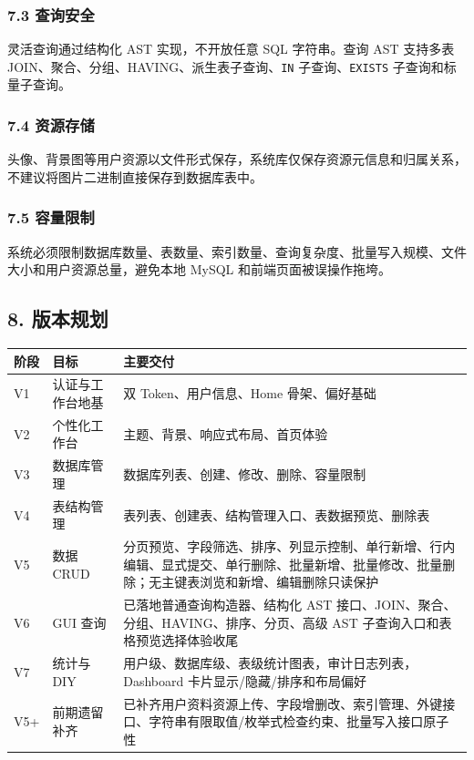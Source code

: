 \documentclass[
  a4paper,
  UTF8]{ctexart}
\begin{document}
\hypertarget{ux67e5ux8be2ux5b89ux5168}{%
\subsubsection{7.3 查询安全}\label{ux67e5ux8be2ux5b89ux5168}}

灵活查询通过结构化 AST 实现，不开放任意 SQL 字符串。查询 AST 支持多表
JOIN、聚合、分组、HAVING、派生表子查询、\texttt{IN}
子查询、\texttt{EXISTS} 子查询和标量子查询。

\hypertarget{ux8d44ux6e90ux5b58ux50a8}{%
\subsubsection{7.4 资源存储}\label{ux8d44ux6e90ux5b58ux50a8}}

头像、背景图等用户资源以文件形式保存，系统库仅保存资源元信息和归属关系，不建议将图片二进制直接保存到数据库表中。

\hypertarget{ux5bb9ux91cfux9650ux5236}{%
\subsubsection{7.5 容量限制}\label{ux5bb9ux91cfux9650ux5236}}

系统必须限制数据库数量、表数量、索引数量、查询复杂度、批量写入规模、文件大小和用户资源总量，避免本地
MySQL 和前端页面被误操作拖垮。

\hypertarget{ux7248ux672cux89c4ux5212}{%
\subsection{8. 版本规划}\label{ux7248ux672cux89c4ux5212}}

\begin{longtable}[]{@{}
  >{\raggedright\arraybackslash}p{}
  >{\raggedright\arraybackslash}p{}
  >{\raggedright\arraybackslash}p{}@{}}
\toprule
阶段 & 目标 & 主要交付 \\
\midrule
\endhead
V1 & 认证与工作台地基 & 双 Token、用户信息、Home 骨架、偏好基础 \\
V2 & 个性化工作台 & 主题、背景、响应式布局、首页体验 \\
V3 & 数据库管理 & 数据库列表、创建、修改、删除、容量限制 \\
V4 & 表结构管理 & 表列表、创建表、结构管理入口、表数据预览、删除表 \\
V5 & 数据 CRUD &
分页预览、字段筛选、排序、列显示控制、单行新增、行内编辑、显式提交、单行删除、批量新增、批量修改、批量删除；无主键表浏览和新增、编辑删除只读保护 \\
V6 & GUI 查询 & 已落地普通查询构造器、结构化 AST
接口、JOIN、聚合、分组、HAVING、排序、分页、高级 AST
子查询入口和表格预览选择体验收尾 \\
V7 & 统计与 DIY &
用户级、数据库级、表级统计图表，审计日志列表，Dashboard
卡片显示/隐藏/排序和布局偏好 \\
V5+ & 前期遗留补齐 &
已补齐用户资料资源上传、字段增删改、索引管理、外键接口、字符串有限取值/枚举式检查约束、批量写入接口原子性 \\
\bottomrule
\end{longtable}
\end{document}

